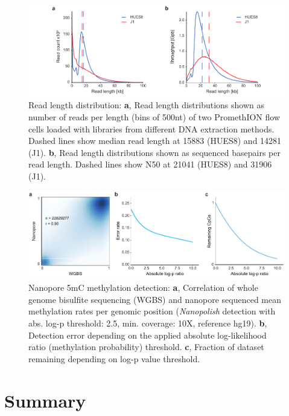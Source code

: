 \begin{figure}[h]
    \centering
    \includegraphics[width=1.0\textwidth]{figures/state_of_art/read_length.pdf}
    \captionsetup{format=plain}
    \caption[Read length median and N50]{Read length distribution: \textbf{a}, Read length distributions shown as number of reads per length (bins of 500nt) of two PromethION flow cells loaded with libraries from different DNA extraction methods. Dashed lines show median read length at 15883 (HUES8) and 14281 (J1). \textbf{b}, Read length distributions shown as sequenced basepairs per read length. Dashed lines show N50 at 21041 (HUES8) and 31906 (J1).}
    \label{fig:state_of_art:read_length}
\end{figure}

\begin{figure}[h]
    \centering
    \includegraphics[width=1.0\textwidth]{figures/state_of_art/methylation.pdf}
    \captionsetup{format=plain}
    \caption[Nanopore methylation detection]{Nanopore 5mC methylation detection: \textbf{a}, Correlation of whole genome bisulfite sequencing (WGBS) and nanopore sequenced mean methylation rates per genomic position (\textit{Nanopolish} detection with abs. log-p threshold: 2.5, min. coverage: 10X, reference hg19). \textbf{b}, Detection error depending on the applied absolute log-likelihood ratio (methylation probability) threshold. \textbf{c}, Fraction of dataset remaining depending on log-p value threshold.}
    \label{fig:state_of_art:methylation}
\end{figure}




\section{Summary}
\label{sec:stat_of_art:summary}









